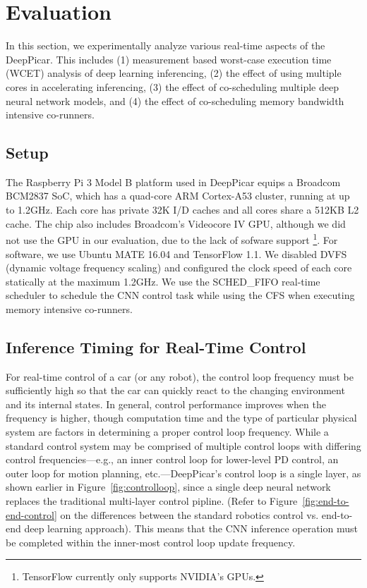 \section{Evaluation}\label{sec:evaluation}

In this section, we experimentally analyze various real-time aspects
of the DeepPicar. This includes
(1) measurement based worst-case execution time (WCET) analysis of
deep learning inferencing,
(2) the effect of using multiple cores in accelerating inferencing,
(3) the effect of co-scheduling multiple deep neural network models,
and 
(4) the effect of co-scheduling memory bandwidth intensive co-runners.

\subsection{Setup}
The Raspberry Pi 3 Model B platform used in DeepPicar equips a Broadcom
BCM2837 SoC, which has a quad-core ARM Cortex-A53 cluster,
running at up to 1.2GHz. Each core has private 32K I/D caches
and all cores share a 512KB L2 cache.
The chip also includes Broadcom's Videocore IV GPU, although we did
not use the GPU in our evaluation, due to the lack of sofware support
\footnote{TensorFlow currently only supports NVIDIA's GPUs.}.
For software, we use Ubuntu MATE 16.04 and TensorFlow 1.1.
We disabled DVFS (dynamic voltage frequency scaling) and
configured the clock speed of each core statically at the maximum 1.2GHz.
We use the SCHED\_FIFO real-time scheduler to schedule the CNN control
task while using the CFS when executing memory intensive co-runners.

\subsection{Inference Timing for Real-Time Control}
For real-time control of a car (or any robot), the control loop
frequency must be sufficiently high so that the car can quickly
react to the changing environment and its internal states. In general,
control performance improves when the frequency is higher, though
computation time and the type of particular physical system are
factors in determining a proper control loop frequency. While a standard
control system may be comprised of multiple control loops with
differing control frequencies---e.g., an inner control loop for lower-level
PD control, an outer loop for motion planning, etc.---DeepPicar's
control loop is a single layer, as shown earlier in
Figure~\ref{fig:controlloop}, since a single deep neural network
replaces the traditional multi-layer control pipline. (Refer to
Figure~\ref{fig:end-to-end-control} on the differences between the
standard robotics control vs. end-to-end deep learning approach).
This means that the CNN inference operation must be completed
within the inner-most control loop update frequency.

